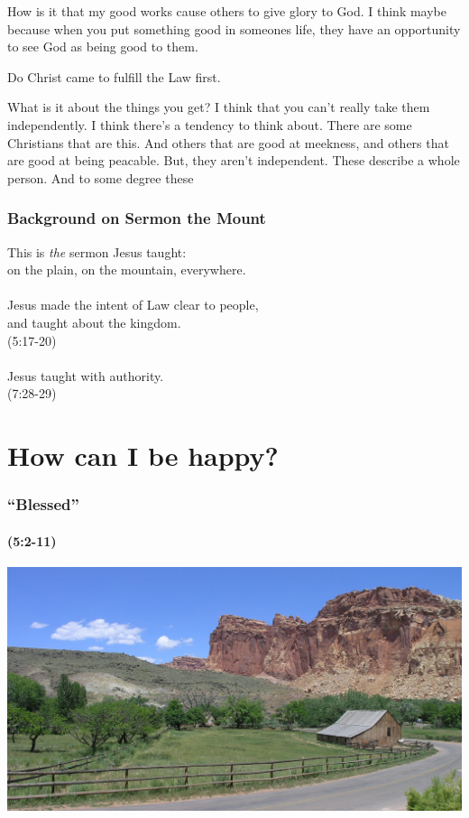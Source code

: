 {How is it that my good works cause others to give glory to God.  I think maybe because when you put something good in someones life, they have an opportunity to see God as being good to them.

Do Christ came to fulfill the Law first.


What is it about the things you get?
I think that you can't really take them independently.
I think there's a tendency to think about.  There are some Christians that are this.  And others that are good at meekness, and others that are good at being peacable.  But, they aren't independent.  These describe a whole person.
And to some degree these 
}

\begin{frame}
\frametitle{Background on Sermon the Mount}
This is \emph{the} sermon Jesus taught:\\
on the plain, on the mountain, everywhere.\\~\\

Jesus made the intent of Law clear to people,\\
and taught about the kingdom.\\(5:17-20)\\~\\

Jesus taught with authority.\\(7:28-29)
\end{frame}

\begin{frame}
\frametitle{\insertlecture}
\tableofcontents[sectionstyle=show/show]
\end{frame}

\section{How can I be happy?}

\begin{frame}
\frametitle{``Blessed''}
\framesubtitle{(5:2-11)}
\includegraphics[width=\textwidth]{graphics/ranch.jpeg}
\end{frame}


